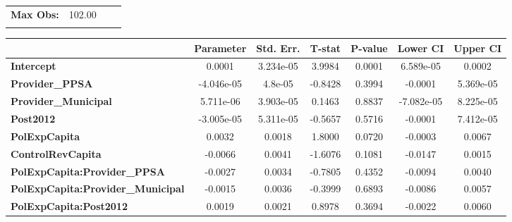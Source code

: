 \begin{center}
\begin{tabular}{lclc}
\textbf{Max Obs:}                                  &       102.00       & \textbf{                     }   &                  \\
\textbf{}                                          &                    & \textbf{                     }   &                  \\
\bottomrule
\end{tabular}
\begin{tabular}{lcccccc}
                                                   & \textbf{Parameter} & \textbf{Std. Err.} & \textbf{T-stat} & \textbf{P-value} & \textbf{Lower CI} & \textbf{Upper CI}  \\
\midrule
\textbf{Intercept}                                 &       0.0001       &     3.234e-05      &      3.9984     &      0.0001      &     6.589e-05     &       0.0002       \\
\textbf{Provider\_PPSA}                            &     -4.046e-05     &       4.8e-05      &     -0.8428     &      0.3994      &      -0.0001      &     5.369e-05      \\
\textbf{Provider\_Municipal}                       &     5.711e-06      &     3.903e-05      &      0.1463     &      0.8837      &     -7.082e-05    &     8.225e-05      \\
\textbf{Post2012}                                  &     -3.005e-05     &     5.311e-05      &     -0.5657     &      0.5716      &      -0.0001      &     7.412e-05      \\
\textbf{PolExpCapita}                              &       0.0032       &       0.0018       &      1.8000     &      0.0720      &      -0.0003      &       0.0067       \\
\textbf{ControlRevCapita}                          &      -0.0066       &       0.0041       &     -1.6076     &      0.1081      &      -0.0147      &       0.0015       \\
\textbf{PolExpCapita:Provider\_PPSA}               &      -0.0027       &       0.0034       &     -0.7805     &      0.4352      &      -0.0094      &       0.0040       \\
\textbf{PolExpCapita:Provider\_Municipal}          &      -0.0015       &       0.0036       &     -0.3999     &      0.6893      &      -0.0086      &       0.0057       \\
\textbf{PolExpCapita:Post2012}                     &       0.0019       &       0.0021       &      0.8978     &      0.3694      &      -0.0022      &       0.0060       \\

\end{tabular}
\end{center}
